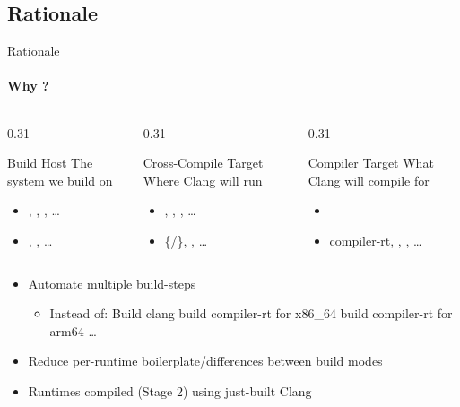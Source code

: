 \subsection{Rationale}
\begin{frame}[fragile,shrink=10]{Rationale}
\framesubtitle{Why ?}

\begin{columns}[t]
\begin{column}{0.31\textwidth}
%
\begin{block}{Build Host}
The system we build on
\begin{itemize}
\item {}, , , \dots
\item {}, , \dots
\end{itemize}
\end{block}
\end{column}%
\begin{column}{0.31\textwidth}%
\begin{block}{Cross-Compile Target}
Where Clang will run
\begin{itemize}
\item {}, , , \dots
\item {}\{/\},  , \dots
\end{itemize}%
\end{block}%
\end{column}%
\begin{column}{0.31\textwidth}%
%
\begin{block}{Compiler Target}
What Clang will compile for
\begin{itemize}
\item {}
\item compiler-rt, , , \dots
\end{itemize}
\end{block}
\end{column}
\end{columns}

\vspace{3ex}

\begin{itemize}
\item Automate multiple build-steps
\begin{itemize}
\item Instead of: Build clang \textrightarrow{} build compiler-rt for x86\_64 \textrightarrow{} build compiler-rt for arm64 \textrightarrow{} \dots
\end{itemize}
\item Reduce per-runtime boilerplate/differences between build modes
\item \alert<2->{Runtimes compiled (Stage 2) using just-built Clang}
\end{itemize}


\end{frame}
